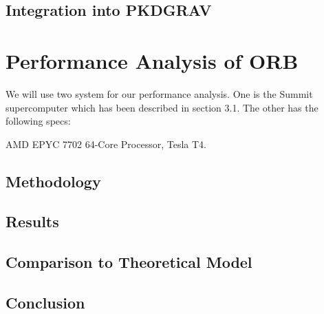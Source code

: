\documentclass[]{article}
\begin{document}
\subsection{Integration into PKDGRAV}



\newpage
\section{Performance Analysis of ORB}

We will use two system for our performance analysis. One is the Summit supercomputer which has been described in section 3.1. The other has the following specs:


AMD EPYC 7702 64-Core Processor, Tesla T4.


\subsection{Methodology}

\subsection{Results}


\begin{comment}
	\begin{figure}[H]
		\begin{center}
			\begin{tikzpicture}
				\begin{axis}[
					height=10cm,width=13cm, 
					title={Measured Performance with $d = 1024$},
					xlabel={Particle Count},
					ylabel={Execution Time (ms)},
					]
					
					\foreach \i in {0,...,3}{
						\pgfmathsetmacro\suffix{int(pow(2,\i))};
						
						\addplot +[] 
						table [col sep=comma, x=N, y=time] 
						{../../code/out/measurements\suffix.csv};
						
						\addlegendentryexpanded{\# $\suffix$};
						
					}	
				\end{axis}
			\end{tikzpicture}
		\end{center}
	\end{figure}
\end{comment}


\subsection{Comparison to Theoretical Model}


\subsection{Conclusion}




\end{document}
